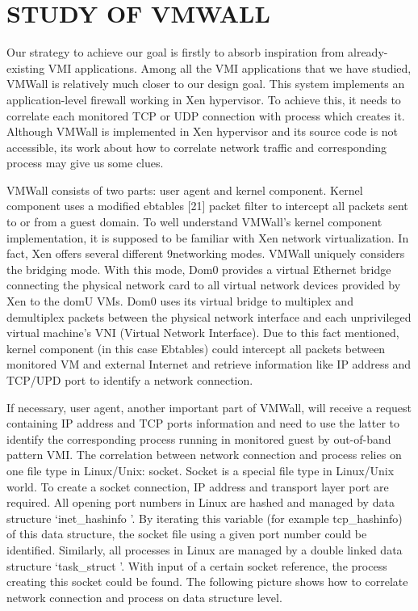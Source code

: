 
\chapter{STUDY OF VMWALL\citep{Reference2}} %

\label{Chapter4} %


Our strategy to achieve our goal is firstly to absorb inspiration from already-existing VMI applications. Among all the
VMI applications that we have studied, VMWall is relatively much closer to our design goal. This system implements
an application-level firewall working in Xen hypervisor. To achieve this, it needs to correlate each monitored TCP or
UDP connection with process which creates it. Although VMWall is implemented in Xen hypervisor and its source code
is not accessible, its work about how to correlate network traffic and corresponding process may give us some clues.

VMWall consists of two parts: user agent and kernel component. Kernel component uses a modified ebtables [21]
packet filter to intercept all packets sent to or from a guest domain. To well understand VMWall’s kernel component
implementation, it is supposed to be familiar with Xen network virtualization. In fact, Xen offers several different
9networking modes. VMWall uniquely considers the bridging mode. With this mode, Dom0 provides a virtual Ethernet
bridge connecting the physical network card to all virtual network devices provided by Xen to the domU VMs. Dom0
uses its virtual bridge to multiplex and demultiplex packets between the physical network interface and each
unprivileged virtual machine’s VNI (Virtual Network Interface). Due to this fact mentioned, kernel component (in this
case Ebtables) could intercept all packets between monitored VM and external Internet and retrieve information like IP
address and TCP/UPD port to identify a network connection.

If necessary, user agent, another important part of VMWall, will receive a request containing IP address and TCP ports
information and need to use the latter to identify the corresponding process running in monitored guest by out-of-band
pattern VMI. The correlation between network connection and process relies on one file type in Linux/Unix: socket.
Socket is a special file type in Linux/Unix world. To create a socket connection, IP address and transport layer port are
required. All opening port numbers in Linux are hashed and managed by data structure \lq inet\_hashinfo \rq. By iterating this
variable (for example tcp\_hashinfo) of this data structure, the socket file using a given port number could be identified. Similarly, all processes in Linux are managed by a double linked data structure \lq task\_struct \rq. With input of a certain socket reference, the process creating this socket could be found. The following picture shows how to correlate network
connection and process on data structure level.

